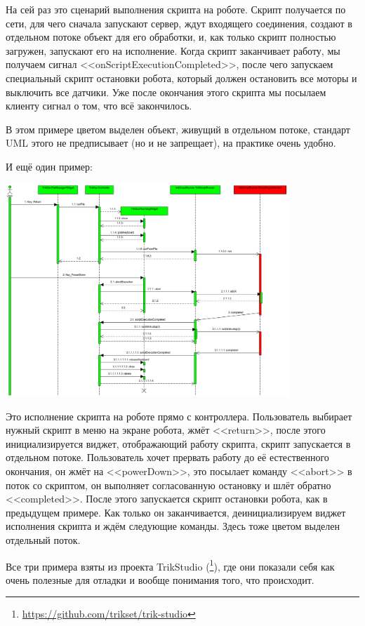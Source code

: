 \documentclass[a5paper]{article}
\begin{document}
На сей раз это сценарий выполнения скрипта на роботе. Скрипт получается по сети, для чего сначала запускают сервер, ждут входящего соединения, создают в отдельном потоке объект для его обработки, и, как только скрипт полностью загружен, запускают его на исполнение. Когда скрипт заканчивает работу, мы получаем сигнал <<onScriptExecutionCompleted>>, после чего запускаем специальный скрипт остановки робота, который должен остановить все моторы и выключить все датчики. Уже после окончания этого скрипта мы посылаем клиенту сигнал о том, что всё закончилось.

В этом примере цветом выделен объект, живущий в отдельном потоке, стандарт UML этого не предписывает (но и не запрещает), на практике очень удобно.

И ещё один пример:

\begin{center}
	\includegraphics[width=0.8\textwidth]{sequenceDiagramExample3.png}
\end{center}

Это исполнение скрипта на роботе прямо с контроллера. Пользователь выбирает нужный скрипт в меню на экране робота, жмёт <<return>>, после этого инициализируется виджет, отображающий работу скрипта, скрипт запускается в отдельном потоке. Пользователь хочет прервать работу до её естественного окончания, он жмёт на <<powerDown>>, это посылает команду <<abort>> в поток со скриптом, он выполняет согласованную остановку и шлёт обратно <<completed>>. После этого запускается скрипт остановки робота, как в предыдущем примере. Как только он заканчивается, деинициализируем виджет исполнения скрипта и ждём следующие команды. Здесь тоже цветом выделен отдельный поток.

Все три примера взяты из проекта TrikStudio (\footnote{\url{https://github.com/trikset/trik-studio}}), где они показали себя как очень полезные для отладки и вообще понимания того, что происходит.
\end{document}
